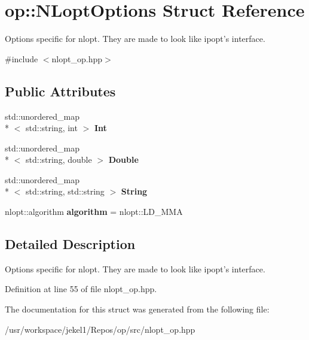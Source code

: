 \hypertarget{structop_1_1NLoptOptions}{\section{op\-:\-:N\-Lopt\-Options Struct Reference}
\label{structop_1_1NLoptOptions}
}


Options specific for nlopt. They are made to look like ipopt's interface.  




{\ttfamily \#include $<$nlopt\-\_\-op.\-hpp$>$}

\subsection*{Public Attributes}
\begin{DoxyCompactItemize}
\item 
\hypertarget{structop_1_1NLoptOptions_a0f28c9240152bce6d9fb75af85bd4d3e}{std\-::unordered\-\_\-map\\*
$<$ std\-::string, int $>$ {\bfseries Int}}\label{structop_1_1NLoptOptions_a0f28c9240152bce6d9fb75af85bd4d3e}

\item 
\hypertarget{structop_1_1NLoptOptions_af38f09e645969cab75a4c88117c29b4a}{std\-::unordered\-\_\-map\\*
$<$ std\-::string, double $>$ {\bfseries Double}}\label{structop_1_1NLoptOptions_af38f09e645969cab75a4c88117c29b4a}

\item 
\hypertarget{structop_1_1NLoptOptions_a7cecdd007ba62f59ad5b46b84baf1d28}{std\-::unordered\-\_\-map\\*
$<$ std\-::string, std\-::string $>$ {\bfseries String}}\label{structop_1_1NLoptOptions_a7cecdd007ba62f59ad5b46b84baf1d28}

\item 
\hypertarget{structop_1_1NLoptOptions_ad914b48412cb1ec19f6d8b571917626b}{nlopt\-::algorithm {\bfseries algorithm} = nlopt\-::\-L\-D\-\_\-\-M\-M\-A}\label{structop_1_1NLoptOptions_ad914b48412cb1ec19f6d8b571917626b}

\end{DoxyCompactItemize}


\subsection{Detailed Description}
Options specific for nlopt. They are made to look like ipopt's interface. 

Definition at line 55 of file nlopt\-\_\-op.\-hpp.



The documentation for this struct was generated from the following file\-:\begin{DoxyCompactItemize}
\item 
/usr/workspace/jekel1/\-Repos/op/src/nlopt\-\_\-op.\-hpp\end{DoxyCompactItemize}
